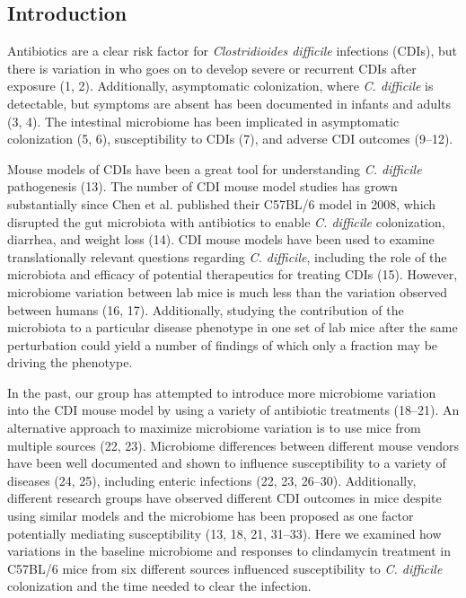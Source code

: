\documentclass[11pt,]{article}
\begin{document}
\newpage

\subsection{Introduction}\label{introduction}

Antibiotics are a clear risk factor for \emph{Clostridioides difficile}
infections (CDIs), but there is variation in who goes on to develop
severe or recurrent CDIs after exposure (1, 2). Additionally,
asymptomatic colonization, where \emph{C. difficile} is detectable, but
symptoms are absent has been documented in infants and adults (3, 4).
The intestinal microbiome has been implicated in asymptomatic
colonization (5, 6), susceptibility to CDIs (7), and adverse CDI
outcomes (9--12).

Mouse models of CDIs have been a great tool for understanding \emph{C.
difficile} pathogenesis (13). The number of CDI mouse model studies has
grown substantially since Chen et al. published their C57BL/6 model in
2008, which disrupted the gut microbiota with antibiotics to enable
\emph{C. difficile} colonization, diarrhea, and weight loss (14). CDI
mouse models have been used to examine translationally relevant
questions regarding \emph{C. difficile}, including the role of the
microbiota and efficacy of potential therapeutics for treating CDIs
(15). However, microbiome variation between lab mice is much less than
the variation observed between humans (16, 17). Additionally, studying
the contribution of the microbiota to a particular disease phenotype in
one set of lab mice after the same perturbation could yield a number of
findings of which only a fraction may be driving the phenotype.

In the past, our group has attempted to introduce more microbiome
variation into the CDI mouse model by using a variety of antibiotic
treatments (18--21). An alternative approach to maximize microbiome
variation is to use mice from multiple sources (22, 23). Microbiome
differences between different mouse vendors have been well documented
and shown to influence susceptibility to a variety of diseases (24, 25),
including enteric infections (22, 23, 26--30). Additionally, different
research groups have observed different CDI outcomes in mice despite
using similar models and the microbiome has been proposed as one factor
potentially mediating susceptibility (13, 18, 21, 31--33). Here we
examined how variations in the baseline microbiome and responses to
clindamycin treatment in C57BL/6 mice from six different sources
influenced susceptibility to \emph{C. difficile} colonization and the
time needed to clear the infection.
\end{document}
